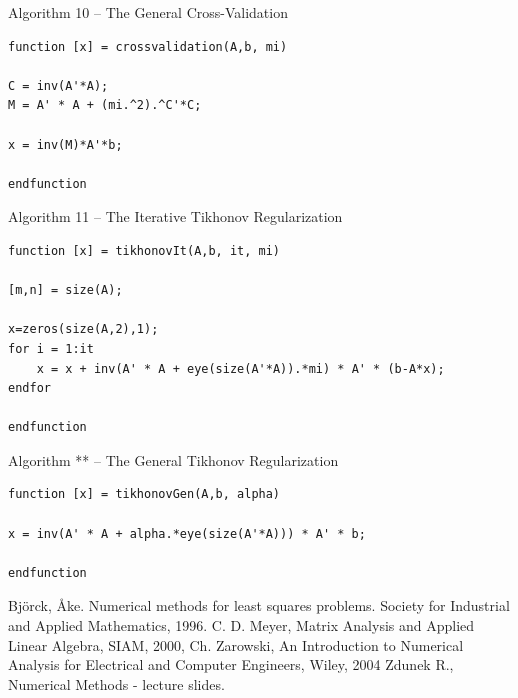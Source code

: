 \documentclass[eng,openany]{mgr}
\begin{document}
Algorithm 10 -- The General Cross-Validation\\
\begin{lstlisting}
function [x] = crossvalidation(A,b, mi)

C = inv(A'*A);
M = A' * A + (mi.^2).^C'*C;

x = inv(M)*A'*b;

endfunction
\end{lstlisting}
Algorithm 11 -- The Iterative Tikhonov Regularization\\
\begin{lstlisting}
function [x] = tikhonovIt(A,b, it, mi)

[m,n] = size(A);

x=zeros(size(A,2),1);
for i = 1:it
	x = x + inv(A' * A + eye(size(A'*A)).*mi) * A' * (b-A*x);
endfor

endfunction
\end{lstlisting}
Algorithm ** -- The General Tikhonov Regularization\\
\begin{lstlisting}
function [x] = tikhonovGen(A,b, alpha)

x = inv(A' * A + alpha.*eye(size(A'*A))) * A' * b;

endfunction
\end{lstlisting}
\begin{thebibliography}{8}
Björck, Åke. Numerical methods for least squares problems. Society for Industrial and Applied Mathematics, 1996.
C. D. Meyer, Matrix Analysis and Applied Linear Algebra, SIAM, 2000, 
Ch. Zarowski, An Introduction to Numerical Analysis for Electrical and Computer Engineers, Wiley, 2004
Zdunek R., Numerical Methods - lecture slides.
\end{thebibliography}
\end{document}
